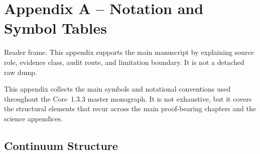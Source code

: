 
\section{Appendix A -- Notation and Symbol Tables}
Reader frame. This appendix supports the main manuscript by explaining source role, evidence class, audit route, and limitation boundary. It is not a detached raw dump.

\label{app:notation}

This appendix collects the main symbols and notational conventions used
throughout the Core~1.3.3 master monograph. It is not exhaustive, but it covers
the structural elements that recur across the main proof-bearing chapters and
the science appendices.

\begingroup
\footnotesize
\RaggedRight
\sloppy

\subsection{Continuum Structure}

